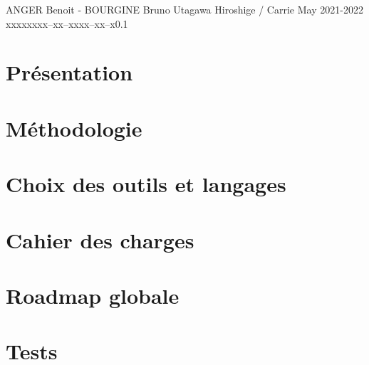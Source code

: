 \documentclass{tstextbook}
\begin{document}
       {ANGER Benoit - BOURGINE Bruno}
       {Utagawa Hiroshige / Carrie May}
       {2021-2022}
       {xxxxx}{xxx--xx--xxxx--xx--x}{0.1}
       {}
       {}



\chapter{Présentation}


\chapter{Méthodologie}


\chapter{Choix des outils et langages}


\chapter{Cahier des charges}


% 

\chapter{Roadmap globale}


% 

% 

% 

\chapter{Tests}


\end{document}
